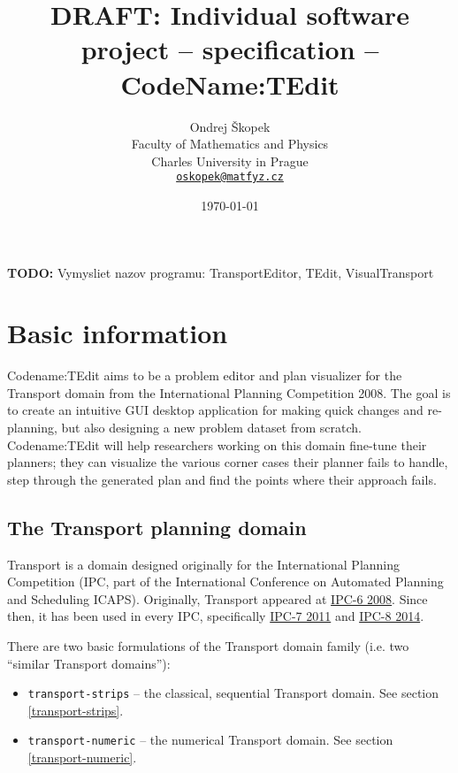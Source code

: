 \documentclass[10pt,a4paper,oneside]{article}
\author{Ondrej Škopek\\
Faculty of Mathematics and Physics\\
Charles University in Prague\\
\texttt{\href{mailto:oskopek@matfyz.cz}{oskopek@matfyz.cz}}}
\title{\textbf{DRAFT:} Individual software project -- specification -- CodeName:TEdit}
\date{\today}
\newcommand{\TODO}[1]{{\textbf{TODO:} #1}} %
\newcommand{\pname}{Codename:TEdit } %
\begin{document}
\maketitle

\TODO Vymysliet nazov programu: TransportEditor, TEdit, VisualTransport











\section{Basic information}

\pname aims to be a problem editor and plan visualizer for the Transport domain from the International Planning Competition 2008.
The goal is to create an intuitive GUI desktop application for making quick changes and re-planning, but also designing a new problem dataset from scratch. \pname will help researchers working on this domain fine-tune their planners; they can visualize the various corner cases their planner fails to handle, step through the generated plan and find the points where their approach fails.

\subsection{The Transport planning domain}

Transport is a domain designed originally for the International Planning Competition (IPC, part of the International Conference on Automated Planning and Scheduling ICAPS).
Originally, Transport appeared at \href{http://icaps-conference.org/ipc2008/deterministic/Domains.html}{IPC-6 2008}.
Since then, it has been used in every IPC, specifically \href{http://www.plg.inf.uc3m.es/ipc2011-deterministic/}{IPC-7 2011}
and \href{https://helios.hud.ac.uk/scommv/IPC-14/}{IPC-8 2014}.

There are two basic formulations of the Transport domain family (i.e. two ``similar Transport domains''):
\begin{itemize}
\item \verb+transport-strips+ -- the classical, sequential Transport domain. See section \ref{transport-strips}.
\item \verb+transport-numeric+ -- the numerical Transport domain. See section \ref{transport-numeric}.
\end{itemize}
\end{document}
